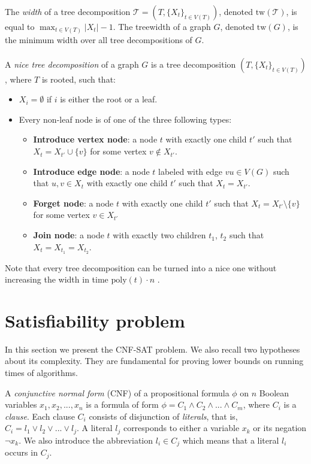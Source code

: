\documentclass[en]{pracamgr}
\theoremstyle{definition}
\newcommand{\cnfsat}{{\sc CNF-SAT}}
\begin{document}
The \emph{width} of a tree decomposition $\mathcal{T} = (T,\{X_t\}_{t\in V(T)})$, denoted $\textrm{tw}(\mathcal{T})$, is equal to $\max_{t \in V(T)} |X_t| - 1$. The treewidth of a graph $G$, denoted $\textrm{tw}(G)$, is the minimum width over all tree decompositions of $G$.
\\\\
A \emph{nice tree decomposition} of a graph $G$ is a tree decomposition $(T, \{X_t\}_{t \in V(T)})$, where $T$ is rooted, such that:
\begin{itemize}
	\item $X_i = \emptyset$ if $i$ is either the root or a leaf.
	\item Every non-leaf node is of one of the three following types:
	\begin{itemize}
		\item \textbf{Introduce vertex node}: a node $t$ with exactly one child $t'$ such that $X_t = X_{t'} \cup \{v\}$ for some vertex $v \notin X_{t'}$.
		\item \textbf{Introduce edge node}: a node $t$ labeled with edge $vu \in V(G)$ such that $u,v \in X_t$ with exactly one child $t'$ such that $X_t = X_{t'}$.
		\item \textbf{Forget node}: a node $t$ with exactly one child $t'$ such that $X_t = X_{t'} \setminus \{v\}$ for some vertex $v \in X_{t'}$
		\item \textbf{Join node}: a node $t$ with exactly two children $t_1$, $t_2$ such that $X_t = X_{t_1} = X_{t_2}$.
	\end{itemize}
\end{itemize}
Note that every tree decomposition can be turned into a nice one without increasing the width in time $\textrm{poly}(t) \cdot n$ \cite{ParAlg}.

\iffalse
We distinguish one special case. If a tree $\mathcal{T}$ forms a path, we call it a \emph{path decomposition}. Respectively, by $\textrm{pw}(\mathcal{T})$ we denote a width of a path decomposition and by $\textrm{pw}(G)$ we denote the minimum width over all path decompositions of $G$.
\fi
\section{Satisfiability problem}

In this section we present the \cnfsat{} problem. We also recall two hypotheses about its complexity. They are fundamental for proving lower bounds on running times of algorithms. 

A \textit{conjunctive normal form} (CNF) of a propositional formula $\phi$ on $n$ Boolean variables $x_1,x_2,...,x_n$ is a formula of form $\phi=C_1 \land C_2 \land ... \land C_m$, where $C_i$ is a \textit{clause}. Each clause $C_i$ consists of disjunction of \textit{literals}, that is, $C_i=l_1 \lor l_2 \lor ... \lor l_j$. A literal $l_j$ corresponds to either a variable $x_k$ or its negation $\neg x_k$. We also introduce the abbreviation $l_i \in C_j$ which means that a literal $l_i$ occurs in $C_j$.
\end{document}
